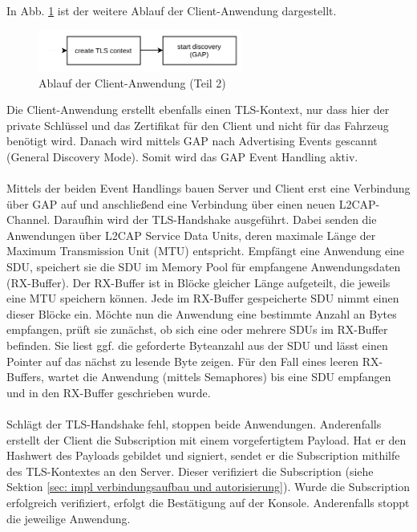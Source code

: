 \\\\
In Abb. \ref{fig: impl ablauf anwendung client teil 2} ist der weitere Ablauf der Client-Anwendung dargestellt.
\begin{figure}[H]
    \centering
    \includegraphics[width=0.6\textwidth]{graphics/ablauf_anwendung_teil_2_client.pdf}
    \caption[Ablauf der Client-Anwendung (Teil 2)]{Ablauf der Client-Anwendung (Teil 2)}
    \label{fig: impl ablauf anwendung client teil 2}
\end{figure}
Die Client-Anwendung erstellt ebenfalls einen TLS-Kontext, nur dass hier der private Schlüssel und das Zertifikat für den Client und nicht für das Fahrzeug benötigt wird. Danach wird mittels GAP nach Advertising Events gescannt (General Discovery Mode). Somit wird das GAP Event Handling aktiv.
\\\\
Mittels der beiden Event Handlings bauen Server und Client erst eine Verbindung über GAP auf und anschließend eine Verbindung über einen neuen L2CAP-Channel. Daraufhin wird der TLS-Handshake ausgeführt. Dabei senden die Anwendungen über L2CAP Service Data Units, deren maximale Länge der Maximum Transmission Unit (MTU) entspricht. Empfängt eine Anwendung eine SDU, speichert sie die SDU im Memory Pool für empfangene Anwendungsdaten (RX-Buffer). Der RX-Buffer ist in Blöcke gleicher Länge aufgeteilt, die jeweils eine MTU speichern können. Jede im RX-Buffer gespeicherte SDU nimmt einen dieser Blöcke ein. Möchte nun die Anwendung eine bestimmte Anzahl an Bytes empfangen, prüft sie zunächst, ob sich eine oder mehrere SDUs im RX-Buffer befinden. Sie liest ggf. die geforderte Byteanzahl aus der SDU und lässt einen Pointer auf das nächst zu lesende Byte zeigen. Für den Fall eines leeren RX-Buffers, wartet die Anwendung (mittels Semaphores) bis eine SDU empfangen und in den RX-Buffer geschrieben wurde.
\\\\
Schlägt der TLS-Handshake fehl, stoppen beide Anwendungen. Anderenfalls erstellt der Client die Subscription mit einem vorgefertigtem Payload. Hat er den Hashwert des Payloads gebildet und signiert, sendet er die Subscription mithilfe des TLS-Kontextes an den Server. Dieser verifiziert die Subscription (siehe Sektion \ref{sec: impl verbindungsaufbau und autorisierung}). Wurde die Subscription erfolgreich verifiziert, erfolgt die Bestätigung auf der Konsole. Anderenfalls stoppt die jeweilige Anwendung.